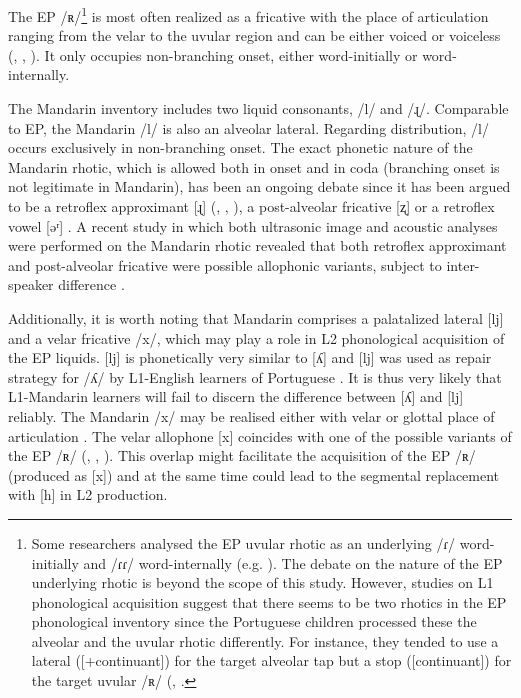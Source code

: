 \documentclass[output=paper]{../langscibook}
\begin{document}
The EP /ʀ/\footnote{\textrm{Some researchers analysed the EP uvular rhotic as an underlying /ɾ/ word-initially and /ɾɾ/ word-internally (e.g. \citealt{MateusAndrade2000}). The debate on the nature of the EP underlying rhotic is beyond the scope of this study. However, studies on L1 phonological acquisition suggest that there seems to be two rhotics in the EP phonological inventory since the Portuguese children processed these the alveolar and the uvular rhotic differently. For instance, they tended to use a lateral ([+continuant]) for the target alveolar tap but a stop ([\textminus continuant]) for the target uvular /ʀ/ (\citealt{Amorim2014}, \citealt{Costa2010}.}}  is most often realized as a fricative with the place of articulation ranging from the velar to the uvular region and can be either voiced or voiceless (\citealt{RennickeMartins2013}, \citealt{Rodrigues2015}, \citealt{Pereira2020}). It only occupies non-branching onset, either word-initially or word-internally.

The Mandarin inventory includes two liquid consonants, /l/ and /ɻ/. Comparable to EP, the Mandarin /l/ is also an alveolar lateral. Regarding distribution, /l/ occurs exclusively in non-branching onset. The exact phonetic nature of the Mandarin rhotic, which is allowed both in onset and in coda (branching onset is not legitimate in Mandarin), has been an ongoing debate since it has been argued to be a retroflex approximant [ɻ] (\citealt{Duanmu2005}, \citealt{Lin2007}, \citealt{Zhu2007}), a post-alveolar fricative [ʐ] or a retroflex vowel [əʳ] \citep{Duanmu2007}. A recent study in which both ultrasonic image and acoustic analyses were performed on the Mandarin rhotic revealed that both retroflex approximant and post-alveolar fricative were possible allophonic variants, subject to inter-speaker difference \citep{Xing2019}.

Additionally, it is worth noting that Mandarin comprises a palatalized lateral [lj] and a velar fricative /x/, which may play a role in L2 phonological acquisition of the EP liquids. [lj] is phonetically very similar to [ʎ] and [lj] was used as repair strategy for /ʎ/ by L1-English learners of Portuguese \citep{OliveiraEtAl2016}. It is thus very likely that L1-Mandarin learners will fail to discern the difference between [ʎ] and [lj] reliably. The Mandarin /x/ may be realised either with velar or glottal place of articulation \citep{Lin2007}. The velar allophone [x] coincides with one of the possible variants of the EP /ʀ/ (\citealt{RennickeMartins2013}, \citealt{Rodrigues2015}, \citealt{Pereira2020}). This overlap might facilitate the acquisition of the EP /ʀ/ (produced as [x]) and at the same time could lead to the segmental replacement with [h] in L2 production.
\end{document}
